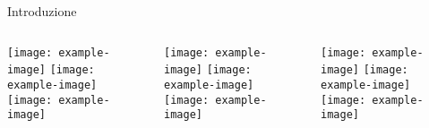 \documentclass{beamer}
\begin{document}
\begin{frame}{Introduzione}
  \begin{columns}[t]
    \begin{column}{.3\textwidth}
        \texttt{[image: example-image]}
        \texttt{[image: example-image]}
        \texttt{[image: example-image]}
    \end{column}
    \begin{column}{.3\textwidth}
        \texttt{[image: example-image]}
        \texttt{[image: example-image]}
        \texttt{[image: example-image]}
    \end{column}
    \begin{column}{.3\textwidth}
        \texttt{[image: example-image]}
        \texttt{[image: example-image]}
        \texttt{[image: example-image]}
    \end{column}    
  \end{columns}
\end{frame}
\end{document}
